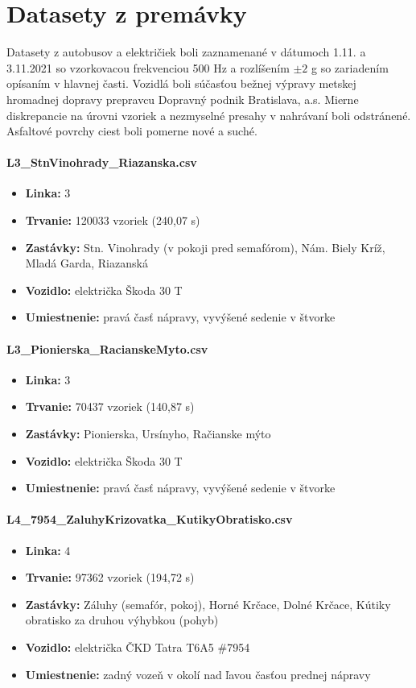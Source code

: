 \section{Datasety z premávky}
Datasety z autobusov a električiek boli zaznamenané v dátumoch 1.11. a 3.11.2021 so vzorkovacou frekvenciou 500 Hz 
a rozlíšením $\pm 2$ g so zariadením opísaním v hlavnej časti. Vozidlá boli súčasťou bežnej výpravy metskej 
hromadnej dopravy prepravcu Dopravný podnik Bratislava, a.s. Mierne diskrepancie na úrovni vzoriek a nezmyselné 
presahy v nahrávaní boli odstránené. Asfaltové povrchy ciest boli pomerne nové a suché.

\paragraph{L3\_StnVinohrady\_Riazanska.csv}
\begin{itemize}[noitemsep, topsep=0pt]
  	\item \textbf{Linka:} 3
  	\item \textbf{Trvanie:} 120033 vzoriek (240,07 s)
  	\item \textbf{Zastávky:} Stn. Vinohrady (v pokoji pred semafórom), Nám. Biely Kríž, Mladá Garda, Riazanská
  	\item \textbf{Vozidlo:} električka Škoda 30 T
	\item \textbf{Umiestnenie:} pravá časť nápravy, vyvýšené sedenie v štvorke
\end{itemize}

\paragraph{L3\_Pionierska\_RacianskeMyto.csv}
\begin{itemize}[noitemsep, topsep=0pt]
  	\item \textbf{Linka:} 3
  	\item \textbf{Trvanie:} 70437 vzoriek (140,87 s)
  	\item \textbf{Zastávky:} Pionierska, Ursínyho, Račianske mýto
  	\item \textbf{Vozidlo:} električka Škoda 30 T
  	\item \textbf{Umiestnenie:} pravá časť nápravy, vyvýšené sedenie v štvorke
\end{itemize}

\paragraph{L4\_7954\_ZaluhyKrizovatka\_KutikyObratisko.csv}
	\begin{itemize}[noitemsep, topsep=0pt]
  	\item \textbf{Linka:} 4
  	\item \textbf{Trvanie:} 97362 vzoriek (194,72 s)
  	\item \textbf{Zastávky:} Záluhy (semafór, pokoj),  Horné Krčace, Dolné Krčace, Kútiky obratisko za druhou výhybkou (pohyb)
  	\item \textbf{Vozidlo:} električka ČKD Tatra T6A5 \#7954
  	\item \textbf{Umiestnenie:} zadný vozeň v okolí nad ľavou časťou prednej nápravy
  	\end{itemize}

